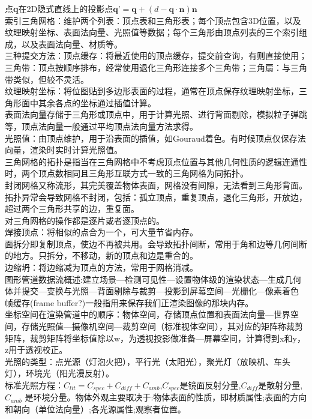 \documentclass[UTF8]{ctexart}
\begin{document}
点\textbf{q}在2D隐式直线上的投影点$\textbf{q'}=\textbf{q}+(d-\textbf{q}\cdot\textbf{n})\textbf{n}$\\
索引三角网格：维护两个列表：顶点表和三角形表；每个顶点包含3D位置，以及纹理映射坐标、表面法向量、光照值等数据；每个三角形由顶点列表的三个索引组成，以及表面法向量、材质等。\\
三种提交方法：顶点缓存：将最近使用的顶点缓存，提交前查询，有则直接使用；三角带：顶点按顺序排布，经常使用退化三角形连接多个三角带；三角扇：与三角带类似，但较不灵活。\\
纹理映射坐标：将位图贴到多边形表面的过程，通常在顶点保存纹理映射坐标，三角形面中其余各点的坐标通过插值计算。\\
表面法向量存储于三角形或顶点中，用于计算光照、进行背面剔除，模拟粒子弹跳等，顶点法向量一般通过平均顶点法向量方法求得。\\
光照值：由顶点维护，用于沿表面的插值，如Gouraud着色。有时候顶点仅保存法向量，渲染时实时计算光照值。\\
三角网格的拓扑是指当在三角网格中不考虑顶点位置与其他几何性质的逻辑连通性时，两个顶点数相同且三角形互联方式一致的三角网格为同拓扑。\\
封闭网格又称流形，其完美覆盖物体表面，网格没有间隙，无法看到三角形背面。\\
拓扑异常会导致网格不封闭，包括：孤立顶点，重复顶点，退化三角形，开放边，超过两个三角形共享的边，重复面。\\
对三角网格的操作都是逐片或者逐顶点的。\\
焊接顶点：将相似的点合为一个，可大量节省内存。\\
面拆分即复制顶点，使边不再被共用。会导致拓扑间断，常用于角和边等几何间断的地方。只拆分，不移动，新的顶点和边是重合的。\\
边缩坍：将边缩减为顶点的方法，常用于网格消减。\\
图形管道数据流概述:建立场景---检测可见性---设置物体级的渲染状态---生成几何体并提交---变换与光照---背面剔除与裁剪---投影到屏幕空间---光栅化---像素着色\\
帧缓存(frame buffer?)一般指用来保存我们正渲染图像的那块内存。\\
坐标空间在渲染管道中的顺序：物体空间，存储顶点位置和表面法向量---世界空间，存储光照值---摄像机空间---裁剪空间（标准视体空间），其对应的矩阵称裁剪矩阵，裁剪矩阵将坐标值除以w，为透视投影做准备---屏幕空间，计算得到x和y，z用于透视校正。\\
光照的类型：点光源（灯泡火把），平行光（太阳光），聚光灯（放映机、车头灯），环境光（阳光漫反射）。\\
标准光照方程：$C_{lit}=C_{spec}+C_{diff}+C_{amb}$,$C_{spec}$是镜面反射分量,$C_{diff}$是散射分量,$C_{amb}$ 是环境分量。物体外观主要取决于:物体表面的性质，即材质属性;表面的方向和朝向（单位法向量）;各光源属性;观察者位置。\\
\end{document}
